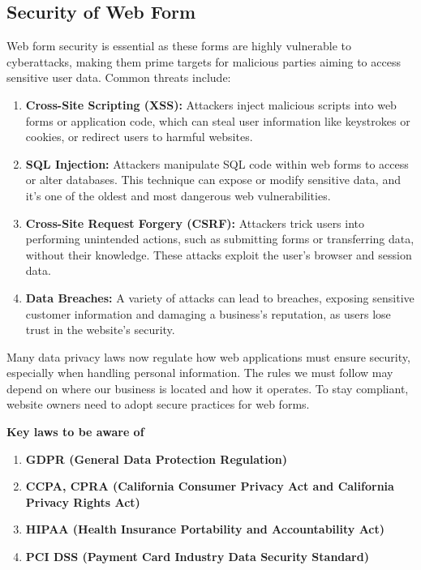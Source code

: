 \documentclass[12pt,oneside,openright,a4paper]{cpe-english-project}
\begin{document}
\subsection{Security of Web Form} Web form security is essential as these forms are highly vulnerable to cyberattacks, making them prime targets for malicious parties aiming to access sensitive user data. 
Common threats include:
\begin{enumerate}
	\item \textbf{Cross-Site Scripting (XSS):} Attackers inject malicious scripts into web forms or application code, which can steal user information like keystrokes or cookies, or redirect users to harmful websites.
	\item \textbf{SQL Injection:} Attackers manipulate SQL code within web forms to access or alter databases. This technique can expose or modify sensitive data, and it’s one of the oldest and most dangerous web vulnerabilities.
	\item \textbf{Cross-Site Request Forgery (CSRF):} Attackers trick users into performing unintended actions, such as submitting forms or transferring data, without their knowledge. These attacks exploit the user’s browser and session data.
	\item \textbf{Data Breaches:} A variety of attacks can lead to breaches, exposing sensitive customer information and damaging a business's reputation, as users lose trust in the website's security.
\end{enumerate}

	Many data privacy laws now regulate how web applications must ensure security, especially when handling personal information. The rules we must follow may depend on where our business is located and how it operates. To stay compliant, website owners need to adopt secure practices for web forms.

\textbf{Key laws to be aware of}
\begin{enumerate}
	\item \textbf{GDPR (General Data Protection Regulation)}
	\item \textbf{CCPA, CPRA (California Consumer Privacy Act and California Privacy Rights Act)}
	\item \textbf{HIPAA (Health Insurance Portability and Accountability Act)}
	\item \textbf{PCI DSS (Payment Card Industry Data Security Standard)}
\end{enumerate}
\end{document}
